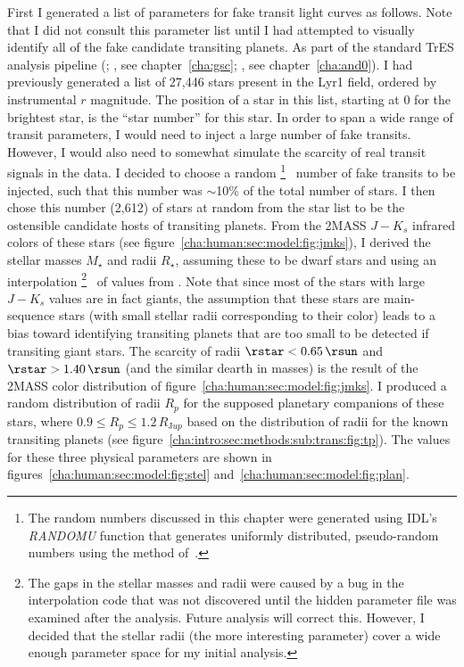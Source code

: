 First I generated a list of parameters for fake transit light curves as follows.
Note that I did not consult this parameter list until I had attempted to visually identify all of the fake candidate transiting planets.
As part of the standard TrES analysis pipeline (\citealp[see, e.g.,][]{Dunham_Mandushev_Taylor:pasp:2004a}; \citealp{ODonovan_Charbonneau_Torres:apj:2006a}, see chapter~\ref{cha:gsc}; \citealp{ODonovan_Charbonneau_Alonso:apj:2007a}, see chapter~\ref{cha:and0}).%
I had previously generated a list of 27,446 stars present in the Lyr1 field, ordered by instrumental $r$ magnitude.
The position of a star in this list, starting at 0 for the brightest star, is the ``star number'' for this star.
In order to span a wide range of transit parameters, I would need to inject a large number of fake transits.
However, I would also need to somewhat simulate the scarcity of real transit signals in the data.
I decided to choose a random%
\footnote{%
The random numbers discussed in this chapter were generated using IDL's \textit{RANDOMU} function that generates uniformly distributed, pseudo-random numbers using the method of~\citet{Park_Miller:ACM:1988a}.%
}%
\ number of fake transits to be injected, such that this number was $\sim$10\% of the total number of stars.
I then chose this number (2,612) of stars at random from the star list to be the ostensible candidate hosts of transiting planets.
From the 2MASS \citep{Cutri_Skrutskie_van-Dyk:2003a} $J-K_{s}$ infrared colors of these stars (see figure~\ref{cha:human:sec:model:fig:jmks}), I derived the stellar masses $M_{\star}$ and radii $R_{\star}$, assuming these to be dwarf stars and using an interpolation%
\footnote{%
The gaps in the stellar masses and radii were caused by a bug in the interpolation code that was not discovered until the hidden parameter file was examined after the analysis.
Future analysis will correct this.
However, I decided that the stellar radii (the more interesting parameter) cover a wide enough parameter space for my initial analysis.%
}%
\ of values from \citet{Cox::2000a}.
Note that since most of the stars with large $J-K_{s}$ values are in fact giants, the assumption that these stars are main-sequence stars (with small stellar radii corresponding to their color) leads to a bias toward identifying transiting planets that are too small to be detected if transiting giant stars.
The scarcity of radii $\rstar<0.65\,\rsun$ and $\rstar>1.40\,\rsun$ (and the similar dearth in masses) is the result of the 2MASS color distribution of figure~\ref{cha:human:sec:model:fig:jmks}.
I produced a random distribution of radii $R_{p}$ for the supposed planetary companions of these stars, where $0.9\leq R_{p} \leq 1.2\,R_{\mathrm Jup}$ based on the distribution of radii for the known transiting planets (see figure~\ref{cha:intro:sec:methods:sub:trans:fig:tp}).
The values for these three physical parameters are shown in figures~\ref{cha:human:sec:model:fig:stel} and~\ref{cha:human:sec:model:fig:plan}.

